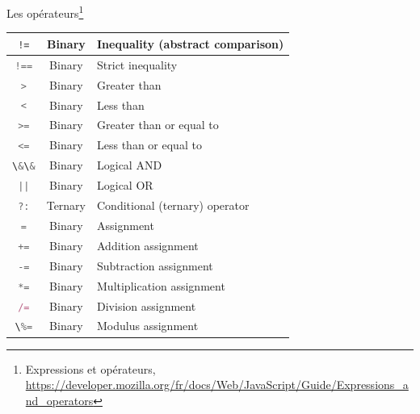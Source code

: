 \documentclass{beamer}
\begin{document}
\begin{frame}{Les opérateurs\footnote{\label{operators}Expressions et opérateurs, \url{https://developer.mozilla.org/fr/docs/Web/JavaScript/Guide/Expressions_and_operators}}}
\begin{tiny}
\begin{table}[h!]
\begin{tabular}{|c|c|p{8cm}|}
                    \hline
                    \lstinline[language=Javascript]|!=|   & Binary        & Inequality (abstract comparison) \\
                    \hline
                    \lstinline[language=Javascript]|!==|  & Binary        & Strict inequality                \\
                    \hline
                    \lstinline[language=Javascript]!>!    & Binary        & Greater than                     \\
                    \hline
                    \lstinline[language=Javascript]!<!    & Binary        & Less than                        \\
                    \hline
                    \lstinline[language=Javascript]!>=!   & Binary        & Greater than or equal to         \\
                    \hline
                    \lstinline[language=Javascript]!<=!   & Binary        & Less than or equal to            \\
                    \hline
                    \lstinline[language=Javascript]!\&\&! & Binary        & Logical AND                      \\
                    \hline
                    \lstinline[language=Javascript]!||!   & Binary        & Logical OR                       \\
                    \hline
                    \lstinline[language=Javascript]!?:!   & Ternary       & Conditional (ternary) operator   \\
                    \hline
                    \lstinline[language=Javascript]!=!    & Binary        & Assignment                       \\
                    \hline
                    \lstinline[language=Javascript]!+=!   & Binary        & Addition assignment              \\
                    \hline
                    \lstinline[language=Javascript]!-=!   & Binary        & Subtraction assignment           \\
                    \hline
                    \lstinline[language=Javascript]!*=!   & Binary        & Multiplication assignment        \\
                    \hline
                    \lstinline[language=Javascript]!/=!   & Binary        & Division assignment              \\
                    \hline
                    \lstinline[language=Javascript]!\%=!  & Binary        & Modulus assignment               \\
                    \hline
                \end{tabular}
            \end{table}
        \end{tiny}
    \end{frame}
\end{document}
